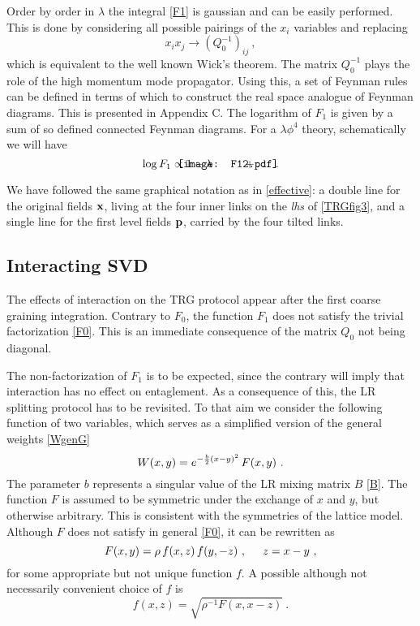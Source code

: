\documentclass[a4paper,preprintnumbers,nofootinbib,twocolumn]{quantumarticle}
\newcommand{\be}{\begin{equation}} \newcommand{\ee}{\end{equation}}
\begin{document}
Order by order in $\lambda$ the integral \eqref{F1} is gaussian and can be easily performed. This is done by considering all possible pairings of the $x_i$ variables and replacing 
\begin{equation}
x_i x_j \to (Q^{-1}_0)_{ij} \ ,
\label{replacement}
\end{equation} 
which is equivalent to the well known Wick's theorem. The matrix $Q_0^{-1}$ plays the role of the high momentum mode propagator.
Using this, a set of Feynman rules can be defined in terms of which to construct the real space analogue of Feynman diagrams. This is presented in Appendix C.
The logarithm of $F_1$ is given by a sum of so defined connected Feynman diagrams. 
For a $\lambda \phi^4$ theory, schematically we will have
\vspace*{-3.6cm}
\begin{equation}
\log F_1 \propto 1- \lambda  \vcenter{\hbox{\hspace{-12mm} \texttt{[image: F12.pdf]}}} \hspace{-11mm} + \dots \ .
\label{Feynman1}
\end{equation}
\vspace*{-3.8cm}

\noindent  
We have followed the same graphical notation as in \eqref{effective}: a double line for the original fields ${\bf x}$, living at the four inner links on the {\it lhs} of \eqref{TRGfig3},
and a single line for the first level fields ${\bf p}$, carried by the four tilted links.

\subsection{Interacting SVD \label{gSVDS}}


The effects of interaction on the TRG protocol appear after the first coarse graining integration.
Contrary to $F_0$, the function $F_1$ does not satisfy the trivial factorization \eqref{F0}. 
This is an immediate consequence of the matrix $Q_0$ not being diagonal.

The non-factorization of $F_1$ is to be expected, since the contrary will imply that interaction has no effect on entaglement.
As a consequence of this, the LR splitting protocol has to be revisited. 
To that aim we consider
the following function of two variables, which 
serves as a simplified version of the general weights \eqref{WgenG}
\be
W(x,y) =
e^{-{b \over 2} (x-y)^2} \, F(x,y)  \ .
\label{non-gaussian}
\ee
The parameter $b$ represents a singular value of the LR mixing matrix $B$ \eqref{B}. The function $F$ is assumed to be symmetric under the exchange of $x$ and $y$, but otherwise arbitrary. This is consistent with the symmetries of the lattice model. Although $F$ does not satisfy in general  \eqref{F0}, it can be rewritten as
\be
F(x,y)= \rho \, f(x,z)\, f(y,-z) \ , \hspace{5mm} z=x-y \ ,
\label{Fff}
\ee
for some appropriate but not unique function $f$. 
A possible although not necessarily convenient choice of $f$ is
\be
f(x,z)=\sqrt{\rho^{-1} F(x,x-z)} \ .
\ee
\end{document}
